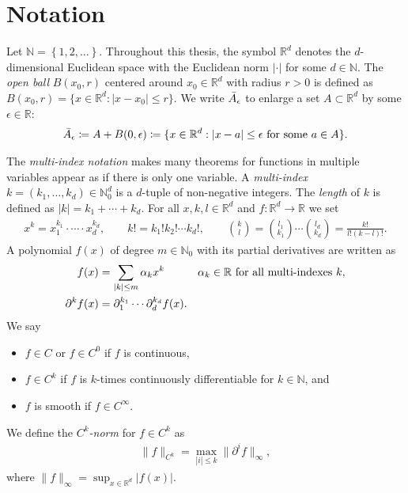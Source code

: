 
\section{Notation}\label{chapter:notation}

Let \( \mathbb{N} = \left\{ 1,2, \ldots \right\} \). Throughout this thesis, the symbol \( \mathbb{R}^d \) denotes the \( d \)-dimensional Euclidean space with the Euclidean norm \( |\cdot| \) for some \( d \in \mathbb{N} \). The \emph{open ball} \(B(x_0, r)\)  centered around \(x_0 \in \mathbb{R}^d\) with radius \(r > 0\) is defined as \(B(x_0,r) = \{ x \in \mathbb{R}^d : |x - x_0| \leq r \} \). We write \(\bar{A}_{\epsilon}\) to enlarge a set \(A \subset \mathbb{R}^d\) by some \(\epsilon \in \mathbb{R} \): 
\begin{align*}
    \bar{A}_{\epsilon} \coloneqq A + B(0, \epsilon) \coloneqq \{ x \in \mathbb{R}^d : |x - a| \leq \epsilon \text{ for some \(a \in A\)} \}.
\end{align*}

The \emph{multi-index notation} makes many theorems for functions in multiple variables appear as if there is only one variable. A \emph{multi-index} \(k = (k_1, \ldots ,k_d) \in \mathbb{N}^d_0\) is a \(d\)-tuple of non-negative integers. The \emph{length} of \(k\) is defined as \(|k| = k_1 + \cdots + k_d\). For all \(x, k,l \in \mathbb{R}^d\) and \(f: \mathbb{R}^d \to \mathbb{R}\) we set
\begin{gather*}
    x^k = x_1^{k_1} \cdot \cdots \cdot x_d^{k_d}, \qquad
    k! = k_1! k_2! \cdots k_d!, \qquad
    \binom{k}{l} = \binom{l_1}{k_1} \cdots \binom{l_d}{k_d} = \frac{k!}{l! (k - l)!}.
\end{gather*}
A polynomial \(f(x)\) of degree \(m \in \mathbb{N}_0\) with its partial derivatives are written as 
\begin{align*}
    f(x) &= \sum\limits_{|k| \leq m} \alpha_{k}x^k \qquad \quad \alpha_k \in \mathbb{R}  \text{ for all multi-indexes \( k \)} ,\\
    \partial^k f(x) &= \partial^{k_1}_{1} \cdots \partial^{k_d}_{d} f(x).
\end{align*}
We say 
\begin{itemize}
    \item \(f \in C\) or \(f \in C^0\) if \(f\) is continuous,
    \item \(f \in C^k\) if \(f\) is {\(k\)-times continuously differentiable} for \(k \in \mathbb{N}\), and
    \item \(f\) is {smooth} if \( f \in C^\infty \).
\end{itemize}
We define the \emph{\(C^k\)-norm} for \( f \in {C}^k \) as 
\begin{align*}
    \lVert f \rVert_{C^k} = \max\limits_{|i| \leq k} \lVert \partial^i f \rVert_{\infty},
\end{align*}
where \(\lVert f \rVert_{\infty} = \sup_{x \in \mathbb{R}^d} |f(x)|\). 

